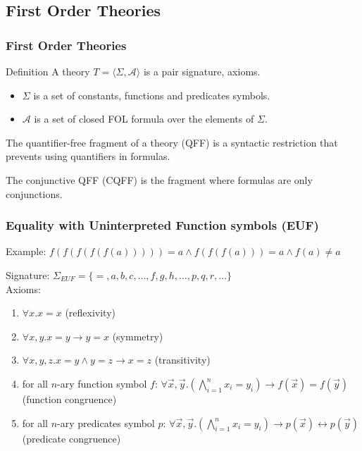 \documentclass{beamer}
\begin{document}
\subsection{First Order Theories}
\begin{frame}
  \frametitle{First Order Theories}
  \begin{block}{Definition}
  A theory $T = \langle \Sigma, \mathcal{A} \rangle$ is a pair signature, axioms.
  \begin{itemize}
  \item $\Sigma$ is a set of constants, functions and predicates symbols.
  \item $\mathcal{A}$ is a set of closed FOL formula over the elements of $\Sigma$.
  \end{itemize}
  \end{block}

  The quantifier-free fragment of a theory (QFF) is a syntactic restriction that prevents using quantifiers in formulas.
  
  The conjunctive QFF (CQFF) is the fragment where formulas are only conjunctions.
\end{frame}

\begin{frame}
  \frametitle{Equality with Uninterpreted Function symbols (EUF)}
  Example: $f(f(f(f(f(a))))) = a \land f(f(f(a))) = a \land f(a) \neq a$

  \vspace{10pt}

  Signature: $\Sigma_{EUF} = \{ =, a, b, c, \ldots, f, g, h, \ldots, p, q, r, \ldots \}$\\
  Axioms:
  \begin{enumerate}
  \item $\forall x. x = x$ \hfill (reflexivity)
  \item $\forall x, y. x = y \rightarrow y = x$ \hfill (symmetry)
  \item $\forall x, y, z. x = y \land y = z \rightarrow x = z$ \hfill (transitivity)
  \item for all $n$-ary function symbol $f$:
    $\forall \vec x, \vec y. \left( \bigwedge_{i=1}^n x_i = y_i \right) \rightarrow f(\vec x) = f(\vec y)$
    \hfill (function congruence)
  \item for all $n$-ary predicates symbol $p$:
    $\forall \vec x, \vec y. \left( \bigwedge_{i=1}^n x_i = y_i \right) \rightarrow p(\vec x) \leftrightarrow p(\vec y)$
    \hfill (predicate congruence)
  \end{enumerate}
\end{frame}
\end{document}
